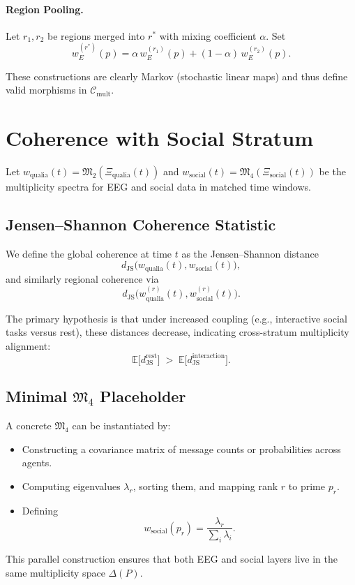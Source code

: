 \documentclass[11pt]{article}
\begin{document}
\paragraph{Region Pooling.}
Let \(r_1, r_2\) be regions merged into \(r^\ast\) with mixing coefficient \(\alpha\). Set
\[
  w_{E}^{(r^\ast)}(p) = \alpha \, w_{E}^{(r_1)}(p) + (1-\alpha)\, w_{E}^{(r_2)}(p).
\]

These constructions are clearly Markov (stochastic linear maps) and thus define valid morphisms in \(\mathcal{C}_{\mathrm{mult}}\).

\section{Coherence with Social Stratum}

Let \(w_{\text{qualia}}(t) = \mathfrak{M}_2(\Xi_{\text{qualia}}(t))\) and \(w_{\text{social}}(t) = \mathfrak{M}_4(\Xi_{\text{social}}(t))\) be the multiplicity spectra for EEG and social data in matched time windows.

\subsection{Jensen--Shannon Coherence Statistic}

We define the global coherence at time \(t\) as the Jensen--Shannon distance
\[
  d_{\mathrm{JS}}\big(w_{\text{qualia}}(t), w_{\text{social}}(t)\big),
\]
and similarly regional coherence via
\[
  d_{\mathrm{JS}}\big(w_{\text{qualia}}^{(r)}(t), w_{\text{social}}^{(r)}(t)\big).
\]

The primary hypothesis is that under increased coupling (e.g., interactive social tasks versus rest), these distances decrease, indicating cross-stratum multiplicity alignment:
\[
  \mathbb{E}\big[d_{\mathrm{JS}}^{\text{rest}}\big] \;>\; \mathbb{E}\big[d_{\mathrm{JS}}^{\text{interaction}}\big].
\]

\subsection{Minimal \texorpdfstring{\(\mathfrak{M}_4\)}{M4} Placeholder}

A concrete \(\mathfrak{M}_4\) can be instantiated by:
\begin{itemize}
  \item Constructing a covariance matrix of message counts or probabilities across agents.
  \item Computing eigenvalues \(\lambda_r\), sorting them, and mapping rank \(r\) to prime \(p_r\).
  \item Defining
  \[
    w_{\text{social}}(p_r) = \frac{\lambda_r}{\sum_i \lambda_i}.
  \]
\end{itemize}
This parallel construction ensures that both EEG and social layers live in the same multiplicity space \(\Delta(P)\).
\end{document}
